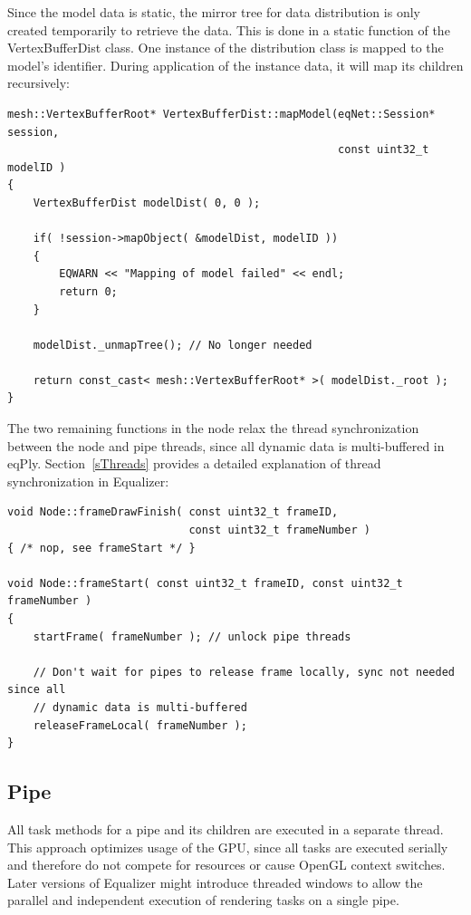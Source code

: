 \documentclass[10pt,a4]{scrartcl}
\newcommand{\sref}[1]{Section~\ref{#1}}
\begin{document}
Since the model data is static, the mirror tree for data distribution
is only created temporarily to retrieve the data. This is done in a
static function of the \textsf{VertexBufferDist} class. One instance of
the distribution class is mapped to the model's identifier. During
application of the instance data, it will map its children recursively:


{\footnotesize\begin{lstlisting}
mesh::VertexBufferRoot* VertexBufferDist::mapModel(eqNet::Session* session,
                                                   const uint32_t modelID )
{
    VertexBufferDist modelDist( 0, 0 );

    if( !session->mapObject( &modelDist, modelID ))
    {
        EQWARN << "Mapping of model failed" << endl;
        return 0;
    }

    modelDist._unmapTree(); // No longer needed    

    return const_cast< mesh::VertexBufferRoot* >( modelDist._root );
}
\end{lstlisting}}%

The two remaining functions in the node relax the thread synchronization
between the node and pipe threads, since all dynamic data is
multi-buffered in \textsf{eqPly}. \sref{sThreads} provides a detailed
explanation of thread synchronization in Equalizer:

{\footnotesize\begin{lstlisting}
void Node::frameDrawFinish( const uint32_t frameID,
                            const uint32_t frameNumber )
{ /* nop, see frameStart */ }

void Node::frameStart( const uint32_t frameID, const uint32_t frameNumber )
{
    startFrame( frameNumber ); // unlock pipe threads
    
    // Don't wait for pipes to release frame locally, sync not needed since all
    // dynamic data is multi-buffered
    releaseFrameLocal( frameNumber );
}
\end{lstlisting}}


\subsection{Pipe}

All task methods for a pipe and its children are executed in a separate
thread. This approach optimizes usage of the GPU, since all
tasks are executed serially and therefore do not compete for resources
or cause OpenGL context switches. Later versions of Equalizer might
introduce threaded windows to allow the parallel and independent
execution of rendering tasks on a single pipe.
\end{document}
